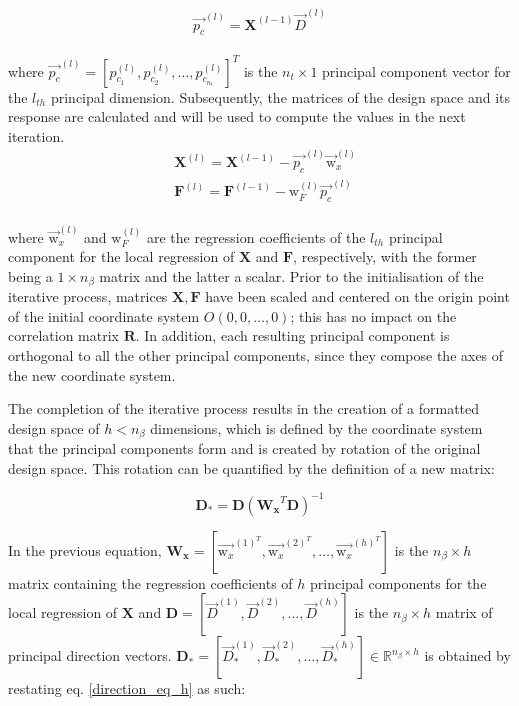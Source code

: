 	\begin{equation}\label{direction_eq_h}
	\vec{p_{c}}^{(l)} = \mathbf{X}^{(l-1)} \vec{D}^{(l)}
	\end{equation}
\\[-3mm]
where $\vec{p_{c}}^{(l)} = [p_{c_{1}}^{(l)}, p_{c_{2}}^{(l)}, 
\hdots, p_{c_{n_{t}}}^{(l)}]^{T}$ is the $n_{t} \times 1$ principal 
component vector for the $l_{th}$ principal dimension.  
Subsequently, the matrices of the design space and its
response are calculated and will be used to compute the 
values in the next iteration. 
	\begin{equation}
	\begin{split}
	& \mathbf{X}^{(l)} = \mathbf{X}^{(l-1)} - 
	\vec{p_{c}}^{(l)} \vec{\mathrm{w}}_{x}^{(l)} \\
	& \mathbf{F}^{(l)} = \mathbf{F}^{(l-1)} - \mathrm{w}
	_{F}^{(l)} \vec{p_{c}}^{(l)} 
	\end{split}
	\end{equation}
\\[-2mm]
where $\vec{\mathrm{w}}_{x}^{(l)}$ and $\mathrm{w}_{F}^{(l)}$ are 
the regression coefficients of the $l_{th}$ principal component for 
the local regression of $\mathbf{X}$ and $\mathbf{F}$, 
respectively, with the former being a $1 \times n_{β}$  matrix and 
the latter a scalar.  Prior to the initialisation of the iterative 
process, matrices $\mathbf{X}, \mathbf{F}$ have been scaled 
and centered on the origin point of the initial coordinate 
system $O(0,0,\hdots,0)$; this has no impact on the correlation 
matrix $\mathbf{R}$. In addition, each resulting principal 
component is orthogonal to all the other principal components, 
since they compose the axes of the new coordinate system.

The completion of the iterative process results in the creation of 
a formatted design space of $h < n_{β}$ dimensions, which is 
defined by the coordinate system that the principal components form
and is created by rotation of the original design space.
This rotation can be quantified by the definition of a new
matrix\cite{rotation_matrix}:

\begin{equation}
\mathbf{D}_{*} = \mathbf{D} \left( \bm{W_{x}}^{Τ} 
\mathbf{D} \right)^{-1}
\end{equation}

\newpage


In the previous equation, $\bm{W_{x}} = [\vec{\mathrm{w}_{x}}
^{(1)^{T}}, \vec{\mathrm{w}_{x}}^{(2)^{T}}, \hdots, \vec{\mathrm{w}
_{x}}^{(h)^{T}}]$ is the $n_{β} \times h$ matrix containing
the regression coefficients of $h$ principal components
for the local regression of $\mathbf{X}$ and $\mathbf{D} = [\vec{D}
^{(1)}, \vec{D}^{(2)}, \hdots, \vec{D}^{(h)}]$ is the $n_{β} 
\times h$ matrix of principal direction vectors. $\mathbf{D}_{*} 
\!= \![\vec{D}_{*}^{(1)}, \vec{D}_{*}^{(2)}, \hdots, \vec{D}_{*}
^{(h)}] \!\in \mathbb{R}^{n_{β} \times h}$ is obtained by restating 
eq. \ref{direction_eq_h} as such:

